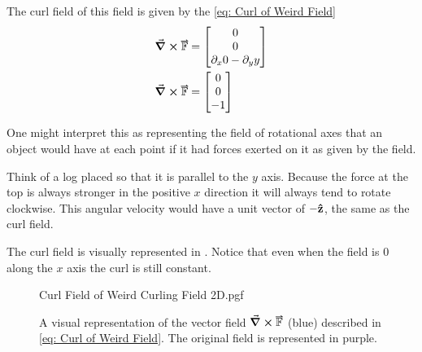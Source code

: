 \documentclass[main.tex]{subfiles}
\begin{document}
                    The curl field of this field is given by the \eqref{eq: Curl of Weird Field}
                    \begin{align}
                        \curl{\vect{\mathbb{F}}} &= \Matrix{0\\0\\\partial_x 0 - \partial_y y}\nonumber\\
                        \curl{\vect{\mathbb{F}}} &= \Matrix{0\\0\\-1} \label{eq: Curl of Weird Field}
                    \end{align}

                    One might interpret this as representing the field of rotational axes that an object would have at each point if it had forces exerted on it as given by the field.

                    Think of a log placed so that it is parallel to the $y$ axis. Because the force at the top is always stronger in the positive $x$ direction it will always tend to rotate clockwise. This angular velocity would have a unit vector of $-\boldsymbol{\mathbf{\hat{z}}}$, the same as the curl field.

                    \vspace{1em}
                    The curl field is visually represented in . Notice that even when the field is 0 along the $x$ axis the curl is still constant.

                    \begin{figure}[h]
                        \centering
                        \scalebox{0.6}
                        {
                            \begin{adjustbox}{clip,trim=150mm 60mm 135mm 50mm}
                                {{Curl Field of Weird Curling Field 2D.pgf}}
                            \end{adjustbox}
                        }
                        \captionsetup{singlelinecheck=off}
                        \caption[.]{A visual representation of the vector field $\protect \curl{\vect{\mathbb{F}}}$ (blue) described in \\\eqref{eq: Curl of Weird Field}.  The original field is represented in purple.}
                        \label{fig: Curl Field of Weird Curling Field}
                    \end{figure}
                    \FloatBarrier
                    \vspace*{2em}
\end{document}
